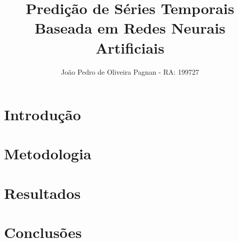 \documentclass[11pt]{article}
\title{Predição de Séries Temporais Baseada em Redes Neurais
Artificiais}
\author{João Pedro de Oliveira Pagnan - RA: 199727}
\begin{document}

\section{Introdução}

\section{Metodologia}

\section{Resultados}

\section{Conclusões}

%
%

\end{document}

